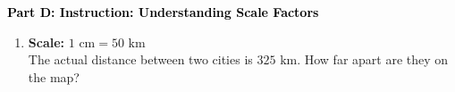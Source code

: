 \documentclass[12pt, letterpaper, fleqn]{article}
\begin{document}
\newpage

\begin{tcolorbox}[colback=customteal!20]
\large\textcolor{black}{\textbf{Part D: Instruction: Understanding Scale Factors}}
\end{tcolorbox}

\vspace{3mm}

\begin{enumerate}[itemsep=2.2cm, leftmargin=0.6cm, resume]
\item \textbf{Scale:} $1\text{ cm} = 50\text{ km}$ \\
The actual distance between two cities is $325\text{ km}$. How far apart are they on the map?
\end{enumerate}
\end{document}
